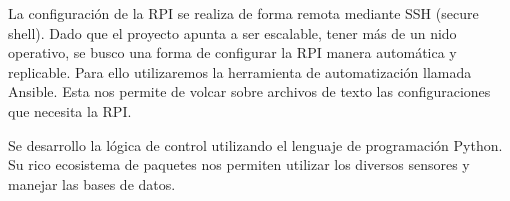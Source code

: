 La configuración de la RPI se realiza de forma remota mediante SSH (secure shell).
Dado que el proyecto apunta a ser escalable, tener más de un nido operativo, se busco una forma de configurar la RPI manera automática y replicable. Para ello utilizaremos la herramienta  de automatización llamada Ansible. Esta nos permite de volcar sobre archivos de texto las configuraciones que necesita la RPI.

Se desarrollo la lógica de control utilizando el lenguaje de programación Python. Su rico ecosistema de paquetes nos permiten utilizar los diversos sensores y manejar las bases de datos.













